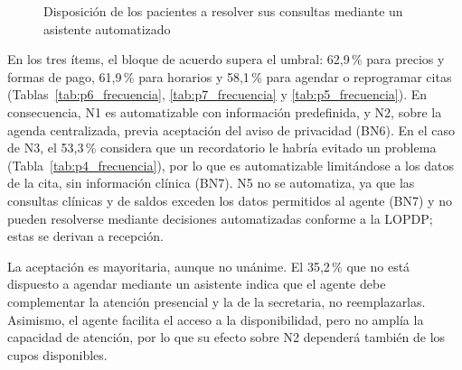\begin{figure}[H]
\centering
{}
\caption{Disposición de los pacientes a resolver sus consultas mediante un asistente automatizado}
\label{fig:aceptacion}
\end{figure}

En los tres ítems, el bloque de acuerdo supera el umbral: 62,9\,\% para precios y formas de pago, 61,9\,\% para horarios y 58,1\,\% para agendar o reprogramar citas (Tablas~\ref{tab:p6_frecuencia}, \ref{tab:p7_frecuencia} y \ref{tab:p5_frecuencia}). En consecuencia, N1 es automatizable con información predefinida, y N2, sobre la agenda centralizada, previa aceptación del aviso de privacidad (BN6). En el caso de N3, el 53,3\,\% considera que un recordatorio le habría evitado un problema (Tabla~\ref{tab:p4_frecuencia}), por lo que es automatizable limitándose a los datos de la cita, sin información clínica (BN7). N5 no se automatiza, ya que las consultas clínicas y de saldos exceden los datos permitidos al agente (BN7) y no pueden resolverse mediante decisiones automatizadas conforme a la LOPDP; estas se derivan a recepción.

La aceptación es mayoritaria, aunque no unánime. El 35,2\,\% que no está dispuesto a agendar mediante un asistente indica que el agente debe complementar la atención presencial y la de la secretaria, no reemplazarlas. Asimismo, el agente facilita el acceso a la disponibilidad, pero no amplía la capacidad de atención, por lo que su efecto sobre N2 dependerá también de los cupos disponibles.

